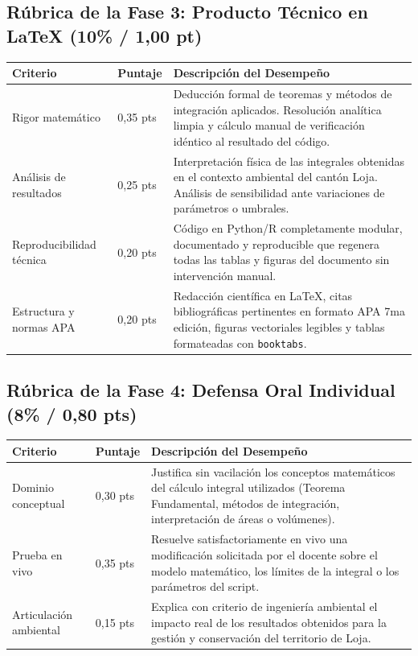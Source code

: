 \documentclass[11pt,a4paper]{article}
\begin{document}
\vspace{0.15cm}

\subsection{Rúbrica de la Fase 3: Producto Técnico en \LaTeX{} (10\% / 1,00 pt)}
\begin{tabularx}{\textwidth}{L{2.8cm} C{2.0cm} Y}
\toprule
\textbf{Criterio} & \textbf{Puntaje} & \textbf{Descripción del Desempeño} \\
\midrule
Rigor matemático & 0,35 pts & Deducción formal de teoremas y métodos de integración aplicados. Resolución analítica limpia y cálculo manual de verificación idéntico al resultado del código. \\
Análisis de resultados & 0,25 pts & Interpretación física de las integrales obtenidas en el contexto ambiental del cantón Loja. Análisis de sensibilidad ante variaciones de parámetros o umbrales. \\
Reproducibilidad técnica & 0,20 pts & Código en Python/R completamente modular, documentado y reproducible que regenera todas las tablas y figuras del documento sin intervención manual. \\
Estructura y normas APA & 0,20 pts & Redacción científica en \LaTeX{}, citas bibliográficas pertinentes en formato APA 7ma edición, figuras vectoriales legibles y tablas formateadas con \texttt{booktabs}. \\
\bottomrule
\end{tabularx}

\vspace{0.15cm}

\subsection{Rúbrica de la Fase 4: Defensa Oral Individual (8\% / 0,80 pts)}
\begin{tabularx}{\textwidth}{L{2.8cm} C{2.0cm} Y}
\toprule
\textbf{Criterio} & \textbf{Puntaje} & \textbf{Descripción del Desempeño} \\
\midrule
Dominio conceptual & 0,30 pts & Justifica sin vacilación los conceptos matemáticos del cálculo integral utilizados (Teorema Fundamental, métodos de integración, interpretación de áreas o volúmenes). \\
Prueba en vivo & 0,35 pts & Resuelve satisfactoriamente en vivo una modificación solicitada por el docente sobre el modelo matemático, los límites de la integral o los parámetros del script. \\
Articulación ambiental & 0,15 pts & Explica con criterio de ingeniería ambiental el impacto real de los resultados obtenidos para la gestión y conservación del territorio de Loja. \\
\bottomrule
\end{tabularx}
\end{document}
